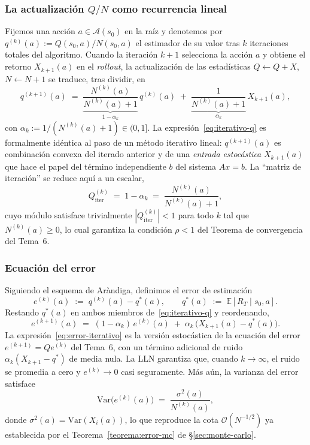 \subsubsection*{La actualización $Q/N$ como recurrencia lineal}

Fijemos una acción $a \in \mathcal{A}(s_0)$ en la raíz y denotemos por $q^{(k)}(a) := Q(s_0,a) / N(s_0,a)$ el estimador de su valor tras $k$ iteraciones totales del algoritmo. Cuando la iteración $k+1$ selecciona la acción $a$ y obtiene el retorno $X_{k+1}(a)$ en el \emph{rollout}, la actualización de las estadísticas $Q \leftarrow Q + X$, $N \leftarrow N + 1$ se traduce, tras dividir, en
\begin{equation}
    q^{(k+1)}(a) \;=\; \underbrace{\frac{N^{(k)}(a)}{N^{(k)}(a) + 1}}_{1 - \alpha_k} \, q^{(k)}(a) \;+\; \underbrace{\frac{1}{N^{(k)}(a) + 1}}_{\alpha_k} \, X_{k+1}(a),
    \label{eq:iterativo-q}
\end{equation}
con $\alpha_k := 1/(N^{(k)}(a)+1) \in (0,1]$. La expresión~\eqref{eq:iterativo-q} es formalmente idéntica al paso de un método iterativo lineal: $q^{(k+1)}(a)$ es combinación convexa del iterado anterior y de una \emph{entrada estocástica} $X_{k+1}(a)$ que hace el papel del término independiente $b$ del sistema $Ax = b$. La ``matriz de iteración'' se reduce aquí a un escalar,
\[
    Q_{\text{iter}}^{(k)} \;=\; 1 - \alpha_k \;=\; \frac{N^{(k)}(a)}{N^{(k)}(a) + 1},
\]
cuyo módulo satisface trivialmente $|Q_{\text{iter}}^{(k)}| < 1$ para todo $k$ tal que $N^{(k)}(a) \geq 0$, lo cual garantiza la condición $\rho < 1$ del Teorema de convergencia del Tema~6.

\subsubsection*{Ecuación del error}

Siguiendo el esquema de Aràndiga, definimos el error de estimación
\[
    e^{(k)}(a) \;:=\; q^{(k)}(a) - q^*(a), \qquad q^*(a) \;:=\; \mathbb{E}[R_T \mid s_0, a].
\]
Restando $q^*(a)$ en ambos miembros de~\eqref{eq:iterativo-q} y reordenando,
\begin{equation}
    e^{(k+1)}(a) \;=\; (1 - \alpha_k)\, e^{(k)}(a) \;+\; \alpha_k\, \bigl( X_{k+1}(a) - q^*(a) \bigr).
    \label{eq:error-iterativo}
\end{equation}
La expresión~\eqref{eq:error-iterativo} es la versión estocástica de la ecuación del error $e^{(k+1)} = Q e^{(k)}$ del Tema~6, con un término adicional de ruido $\alpha_k (X_{k+1} - q^*)$ de media nula. La LLN garantiza que, cuando $k \to \infty$, el ruido se promedia a cero y $e^{(k)} \to 0$ casi seguramente. Más aún, la varianza del error satisface
\[
    \mathrm{Var}\bigl( e^{(k)}(a) \bigr) \;=\; \frac{\sigma^2(a)}{N^{(k)}(a)},
\]
donde $\sigma^2(a) = \mathrm{Var}(X_i(a))$, lo que reproduce la cota $\mathcal{O}(N^{-1/2})$ ya establecida por el Teorema~\ref{teorema:error-mc} de §\ref{sec:monte-carlo}.

